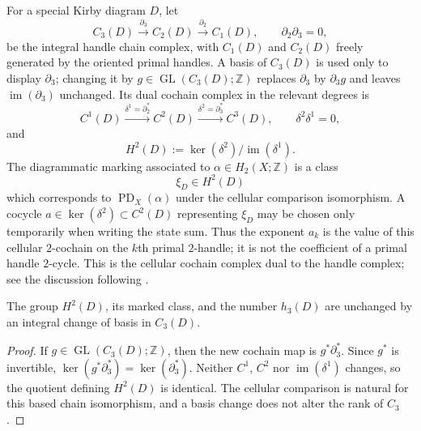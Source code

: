 \begin{definition}
\label{def:handle-homology-marking}
For a special Kirby diagram $D$, let
\[
  C_3(D)\xrightarrow{\partial_3}
  C_2(D)\xrightarrow{\partial_2}C_1(D),
  \qquad \partial_2\partial_3=0,
\]
be the integral handle chain complex, with $C_1(D)$ and $C_2(D)$ freely
generated by the oriented primal handles.  A basis of $C_3(D)$ is used only
to display $\partial_3$; changing it by
$g\in\operatorname{GL}(C_3(D);\mathbb Z)$ replaces $\partial_3$ by
$\partial_3g$ and leaves $\operatorname{im}(\partial_3)$ unchanged.  Its
dual cochain complex in the relevant degrees is
\[
  C^1(D)\xrightarrow{\delta^1=\partial_2^*}
  C^2(D)\xrightarrow{\delta^2=\partial_3^*}C^3(D),
  \qquad \delta^2\delta^1=0,
\]
and
\[
  H^2(D):=\ker(\delta^2)/\operatorname{im}(\delta^1).
\]
The diagrammatic marking associated to
$\alpha\in H_2(X;\mathbb Z)$ is a class
\[
  \xi_D\in H^2(D)
\]
which corresponds to $\operatorname{PD}_X(\alpha)$ under the cellular
comparison isomorphism.  A cocycle
$a\in\ker(\delta^2)\subset C^2(D)$ representing $\xi_D$ may be chosen only
temporarily when writing the state sum.  Thus the exponent $a_k$ is the
value of this cellular $2$-cochain on the $k$th primal $2$-handle; it is not
the coefficient of a primal handle $2$-cycle.  This is the cellular cochain
complex dual to the handle complex; see the discussion following
\cite[Proposition~4.2.13]{GompfStipsicz1999}.
\end{definition}

\begin{lemma}
\label{lem:c3-basis-independence}
The group $H^2(D)$, its marked class, and the number $h_3(D)$ are unchanged
by an integral change of basis in $C_3(D)$.
\end{lemma}

\begin{proof}
If $g\in\operatorname{GL}(C_3(D);\mathbb Z)$, then the new cochain map is
$g^*\partial_3^*$.  Since $g^*$ is invertible,
$\ker(g^*\partial_3^*)=\ker(\partial_3^*)$.  Neither $C^1$, $C^2$ nor
$\operatorname{im}(\delta^1)$ changes, so the quotient defining $H^2(D)$
is identical.  The cellular comparison is natural for this based chain
isomorphism, and a basis change does not alter the rank of $C_3$.
\end{proof}

